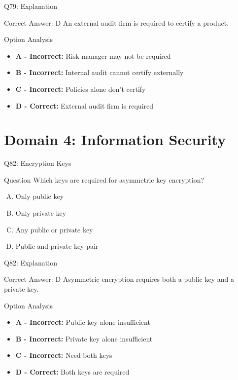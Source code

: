 \documentclass{beamer}
\begin{document}
	\begin{frame}{Q79: Explanation}
		\begin{block}{Correct Answer: D}
			An external audit firm is required to certify a product.
		\end{block}
		\begin{block}{Option Analysis}
			\begin{itemize}
				\item \textbf{A - Incorrect:} Risk manager may not be required
				\item \textbf{B - Incorrect:} Internal audit cannot certify externally
				\item \textbf{C - Incorrect:} Policies alone don't certify
				\item \textbf{D - Correct:} External audit firm is required
			\end{itemize}
		\end{block}
	\end{frame}
	
	
	
	
	
	\section{Domain 4: Information Security}
	
	\begin{frame}{Q82: Encryption Keys}
		\begin{block}{Question}
			Which keys are required for asymmetric key encryption?
		\end{block}
		\begin{enumerate}[(A)]
			\item Only public key
			\item Only private key
			\item Any public or private key
			\item Public and private key pair
		\end{enumerate}
	\end{frame}
	
	\begin{frame}{Q82: Explanation}
		\begin{block}{Correct Answer: D}
			Asymmetric encryption requires both a public key and a private key.
		\end{block}
		\begin{block}{Option Analysis}
			\begin{itemize}
				\item \textbf{A - Incorrect:} Public key alone insufficient
				\item \textbf{B - Incorrect:} Private key alone insufficient
				\item \textbf{C - Incorrect:} Need both keys
				\item \textbf{D - Correct:} Both keys are required
			\end{itemize}
		\end{block}
	\end{frame}
	
\end{document}
